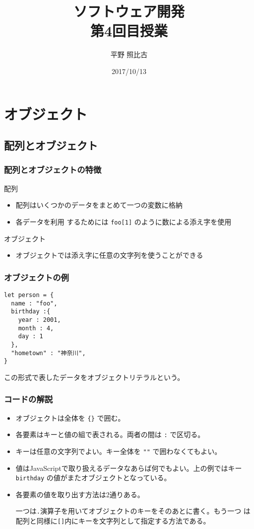 
%
\title{ソフトウェア開発\\第4回目授業}
\author{平野 照比古}
\institute{}
\date{2017/10/13}

\frame{\maketitle}
\section{オブジェクト}
\subsection{配列とオブジェクト}
\begin{frame}[containsverbatim]
\frametitle{配列とオブジェクトの特徴}
配列
\begin{itemize}
 \item 配列はいくつかのデータをまとめて一つの変数に格納
 \item 各データを利用
するためには \Verb+foo[1]+ のように数による添え字を使用
\end{itemize}
オブジェクト
\begin{itemize}
 \item オブジェクトでは添え字に任意の文字列を使うことができる
\end{itemize}
\end{frame}
\begin{frame}[containsverbatim]
\frametitle{オブジェクトの例}
\begin{Verbatim}
let person = {
  name : "foo",
  birthday :{
    year : 2001,
    month : 4,
    day : 1
  },
  "hometown" : "神奈川",
}
\end{Verbatim}
この形式で表したデータをオブジェクトリテラルという。
\end{frame}
\begin{frame}[containsverbatim]
\frametitle{コードの解説}
\begin{itemize}
 \item オブジェクトは全体を \Verb+{}+ で囲む。
 \item 各要素はキーと値の組で表される。両者の間は \Verb+:+ で区切る。
 \item キーは任意の文字列でよい。キー全体を \Verb+""+ で囲わなくてもよい。
 \item 値はJavaScriptで取り扱えるデータなあらば何でもよい。上の例ではキー
       \Verb+birthday+ の値がまたオブジェクトとなっている。
 \item 各要素の値を取り出す方法は2通りある。

一つは\Verb+.+演算子を用いてオブジェクトのキーをそのあとに書く。もう一つ
       は配列と同様に\Verb+[]+内にキーを文字列として指定する方法である。
\end{itemize}
\end{frame}

